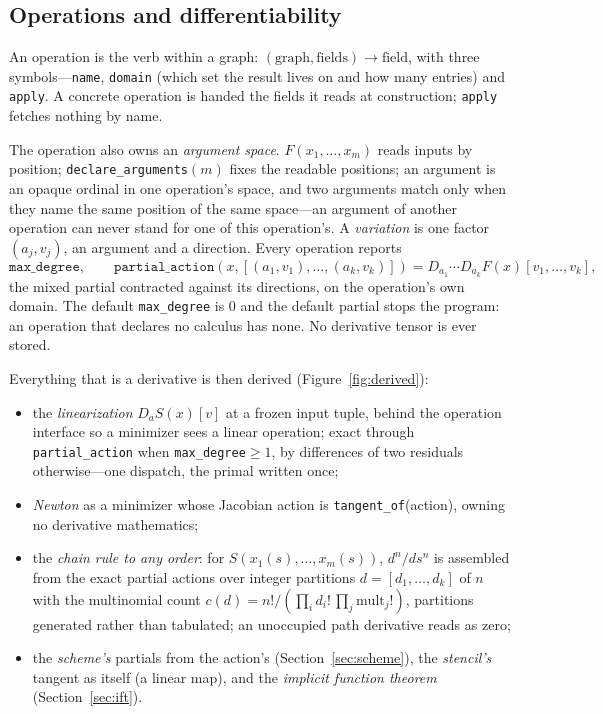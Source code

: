 \documentclass[11pt,a4paper]{article}
\newcommand{\code}[1]{\texttt{#1}}
\begin{document}
\subsection{Operations and differentiability}\label{sec:diff}

An operation is the verb within a graph: $(\text{graph}, \text{fields}) \to \text{field}$, with three symbols---\code{name}, \code{domain} (which set the result lives on and how many entries) and \code{apply}. A concrete operation is handed the fields it reads at construction; \code{apply} fetches nothing by name.

The operation also owns an \emph{argument space}. $F(x_1,\dots,x_m)$ reads inputs by position; \code{declare\_arguments}$(m)$ fixes the readable positions; an argument is an opaque ordinal in one operation's space, and two arguments match only when they name the same position of the same space---an argument of another operation can never stand for one of this operation's. A \emph{variation} is one factor $(a_j, v_j)$, an argument and a direction. Every operation reports
\[
\code{max\_degree},\qquad \code{partial\_action}(x, [(a_1,v_1),\dots,(a_k,v_k)]) = D_{a_1}\cdots D_{a_k}F(x)[v_1,\dots,v_k],
\]
the mixed partial contracted against its directions, on the operation's own domain. The default \code{max\_degree} is 0 and the default partial stops the program: an operation that declares no calculus has none. No derivative tensor is ever stored.

Everything that is a derivative is then derived (Figure~\ref{fig:derived}):
\begin{itemize}[nosep]
\item the \emph{linearization} $D_aS(x)[v]$ at a frozen input tuple, behind the operation interface so a minimizer sees a linear operation; exact through \code{partial\_action} when \code{max\_degree}$\ge1$, by differences of two residuals otherwise---one dispatch, the primal written once;
\item \emph{Newton} as a minimizer whose Jacobian action is \code{tangent\_of}(action), owning no derivative mathematics;
\item the \emph{chain rule to any order}: for $S(x_1(s),\dots,x_m(s))$, $d^n/ds^n$ is assembled from the exact partial actions over integer partitions $d=[d_1,\dots,d_k]$ of $n$ with the multinomial count $c(d) = n!/(\prod_i d_i!\,\prod_j \mathrm{mult}_j!)$, partitions generated rather than tabulated; an unoccupied path derivative reads as zero;
\item the \emph{scheme's} partials from the action's (Section~\ref{sec:scheme}), the \emph{stencil's} tangent as itself (a linear map), and the \emph{implicit function theorem} (Section~\ref{sec:ift}).
\end{itemize}
\end{document}
